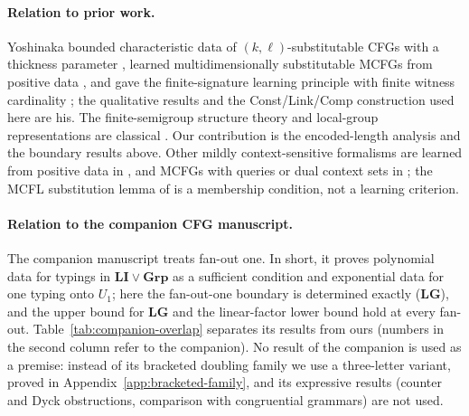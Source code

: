 \paragraph{Relation to prior work.}
Yoshinaka bounded characteristic data of $(k,\ell)$-substitutable CFGs with
a thickness parameter \cite{Yoshinaka2008}, learned multidimensionally
substitutable MCFGs from positive data \cite{Yoshinaka2009,Yoshinaka2011},
and gave the finite-signature learning principle with finite witness
cardinality \cite{Yoshinaka2015General}; the qualitative results and the
Const/Link/Comp construction used here are his.  The finite-semigroup
structure theory and local-group representations are classical
\cite{Straubing1985,Tilson1987,AlmeidaEtAl2009}.  Our contribution is
the encoded-length analysis and the boundary results above.  Other
mildly context-sensitive formalisms are learned from positive data in
\cite{OatesEtAl2006}, and MCFGs with queries or dual context sets in
\cite{Yoshinaka2010,ClarkYoshinaka2014,KanazawaYoshinaka2023}; the MCFL
substitution lemma of \cite{DuncanEtAl2026Substitution} is a membership
condition, not a learning criterion.

\paragraph{Relation to the companion CFG manuscript.}
The companion manuscript \cite{kuriyamaCFG} treats fan-out one.  In short, it
proves polynomial data for typings in $\mathbf{LI}\vee\mathbf{Grp}$ as a
sufficient condition and exponential data for one typing onto $U_1$; here the
fan-out-one boundary is determined exactly ($\mathbf{LG}$), and the upper bound
for $\mathbf{LG}$ and the linear-factor lower bound hold at every fan-out.
Table~\ref{tab:companion-overlap} separates its results from ours (numbers in
the second column refer to the companion).  No result of the companion is used
as a premise: instead of its bracketed doubling family
\cite[Proposition~6.4]{kuriyamaCFG} we use a three-letter variant, proved in
Appendix~\ref{app:bracketed-family}, and its expressive results (counter and
Dyck obstructions, comparison with congruential grammars) are not used.

